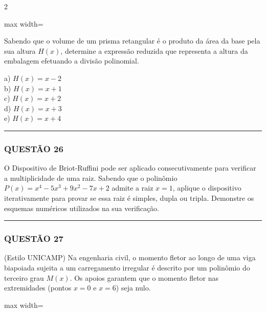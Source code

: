\documentclass[twoside, 10pt, a4paper]{article}
\begin{document}
\begin{multicols*}{2}
\begin{center}
\begin{adjustbox}{max width=\linewidth}
\end{adjustbox}
\end{center}

Sabendo que o volume de um prisma retangular é o produto da área da base pela sua altura $ H(x) $, determine a expressão reduzida que representa a altura da embalagem efetuando a divisão polinomial. 

a) $ H(x) = x - 2 $\\[0.3cm]
b) $ H(x) = x + 1 $\\[0.3cm]
c) $ H(x) = x + 2 $\\[0.3cm]
d) $ H(x) = x + 3 $\\[0.3cm]
e) $ H(x) = x + 4 $

\vspace{0cm} \noindent\textcolor{CorLinha}{\rule{\linewidth}{0.5pt}} \vspace{-0.2cm}
\subsubsection*{QUESTÃO 26}

O Dispositivo de Briot-Ruffini pode ser aplicado consecutivamente para verificar a multiplicidade de uma raiz. Sabendo que o polinômio $ P(x) = x^4 - 5x^3 + 9x^2 - 7x + 2 $ admite a raiz $ x = 1 $, aplique o dispositivo iterativamente para provar se essa raiz é simples, dupla ou tripla. Demonstre os esquemas numéricos utilizados na sua verificação.

\vspace{0cm} \noindent\textcolor{CorLinha}{\rule{\linewidth}{0.5pt}} \vspace{-0.2cm}
\subsubsection*{QUESTÃO 27}

(Estilo UNICAMP) Na engenharia civil, o momento fletor ao longo de uma viga biapoiada sujeita a um carregamento irregular é descrito por um polinômio do terceiro grau $ M(x) $. Os apoios garantem que o momento fletor nas extremidades (pontos $ x = 0 $ e $ x = 6 $) seja nulo.

\begin{center}
\begin{adjustbox}{max width=\linewidth}
\end{adjustbox}
\end{center}
\end{multicols*}
\end{document}
